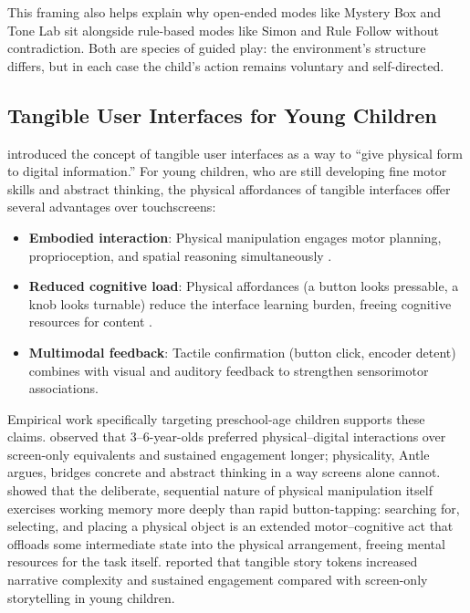 \documentclass[12pt, a4paper]{article}
\begin{document}
This framing also helps explain why open-ended modes like Mystery Box and Tone
Lab sit alongside rule-based modes like Simon and Rule Follow without
contradiction. Both are species of guided play: the environment's structure
differs, but in each case the child's action remains voluntary and
self-directed.

\subsection{Tangible User Interfaces for Young Children}
\label{sec:tui}

\citet{ishii1997tangible} introduced the concept of tangible user interfaces
as a way to ``give physical form to digital information.'' For young children,
who are still developing fine motor skills and abstract thinking, the physical
affordances of tangible interfaces offer several advantages over touchscreens:

\begin{itemize}[noitemsep]
  \item \textbf{Embodied interaction}: Physical manipulation engages motor
    planning, proprioception, and spatial reasoning simultaneously
    \citep{price2003tangibles}.
  \item \textbf{Reduced cognitive load}: Physical affordances (a button looks
    pressable, a knob looks turnable) reduce the interface learning burden,
    freeing cognitive resources for content \citep{marshall2007tangible}.
  \item \textbf{Multimodal feedback}: Tactile confirmation (button click,
    encoder detent) combines with visual and auditory feedback to strengthen
    sensorimotor associations.
\end{itemize}

Empirical work specifically targeting preschool-age children supports these
claims. \citet{antle2013embodied} observed that 3--6-year-olds preferred
physical--digital interactions over screen-only equivalents and sustained
engagement longer; physicality, Antle argues, bridges concrete and abstract
thinking in a way screens alone cannot. \citet{manches2012tangibles} showed
that the deliberate, sequential nature of physical manipulation itself
exercises working memory more deeply than rapid button-tapping: searching for,
selecting, and placing a physical object is an extended motor--cognitive act
that offloads some intermediate state into the physical arrangement, freeing
mental resources for the task itself. \citet{sylla2012tinkrbook} reported that
tangible story tokens increased narrative complexity and sustained engagement
compared with screen-only storytelling in young children.
\end{document}
